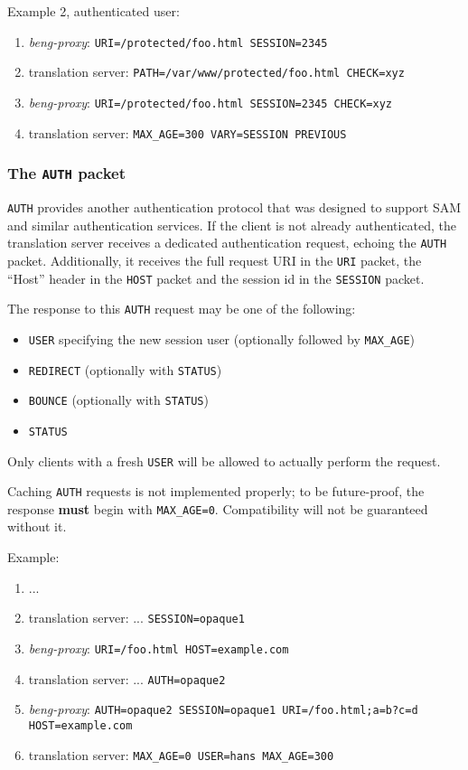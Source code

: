 \documentclass[a4paper,12pt]{article}
\begin{document}
Example 2, authenticated user:

\begin{enumerate}
\item \emph{beng-proxy}: \texttt{URI=/protected/foo.html SESSION=2345}
\item translation server: \texttt{PATH=/var/www/protected/foo.html
  CHECK=xyz}
\item \emph{beng-proxy}: \texttt{URI=/protected/foo.html SESSION=2345
  CHECK=xyz}
\item translation server: \texttt{MAX\_AGE=300 VARY=SESSION PREVIOUS}
\end{enumerate}


\subsubsection{The \texttt{AUTH} packet}
\label{auth}

\texttt{AUTH} provides another authentication protocol that was
designed to support SAM and similar authentication services.  If the
client is not already authenticated, the translation server receives a
dedicated authentication request, echoing the \texttt{AUTH} packet.
Additionally, it receives the full request URI in the \texttt{URI}
packet, the ``Host'' header in the \texttt{HOST} packet and the
session id in the \texttt{SESSION} packet.

The response to this \texttt{AUTH} request may be one of the
following:

\begin{itemize}
\item \texttt{USER} specifying the new session user (optionally
  followed by \verb|MAX_AGE|)
\item \texttt{REDIRECT} (optionally with \texttt{STATUS})
\item \texttt{BOUNCE} (optionally with \texttt{STATUS})
\item \texttt{STATUS}
\end{itemize}

Only clients with a fresh \texttt{USER} will be allowed to actually
perform the request.

Caching \texttt{AUTH} requests is not implemented properly; to be
future-proof, the response \textbf{must} begin with \verb|MAX_AGE=0|.
Compatibility will not be guaranteed without it.

Example:

\begin{enumerate}
\item ...
\item translation server: ... \texttt{SESSION=opaque1}
\item \emph{beng-proxy}: \texttt{URI=/foo.html HOST=example.com}
\item translation server: ... \texttt{AUTH=opaque2}
\item \emph{beng-proxy}: \texttt{AUTH=opaque2 SESSION=opaque1 URI=/foo.html;a=b?c=d HOST=example.com}
\item translation server: \texttt{MAX\_AGE=0 USER=hans MAX\_AGE=300}
\end{enumerate}
\end{document}
